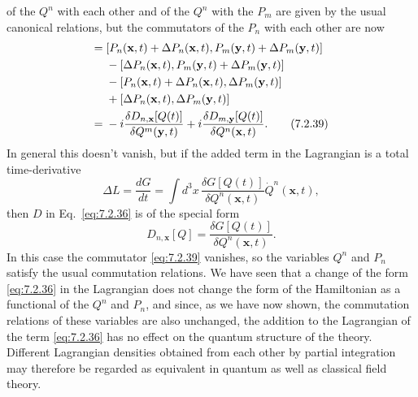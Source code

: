 of the $Q^n$ with each other and of the $Q^n$ with the $P_m$ are given by the
usual canonical relations, but the commutators of the $P_n$ with each other
are now
\begin{align}
[P_n(\mathbf{x},t),P_m(\mathbf{y},t)]
={}&[P_n(\mathbf{x},t)+\Delta P_n(\mathbf{x},t),
P_m(\mathbf{y},t)+\Delta P_m(\mathbf{y},t)]
\notag\\
&-[\Delta P_n(\mathbf{x},t),P_m(\mathbf{y},t)+\Delta P_m(\mathbf{y},t)]
\notag\\
&-[P_n(\mathbf{x},t)+\Delta P_n(\mathbf{x},t),\Delta P_m(\mathbf{y},t)]
\notag\\
&+[\Delta P_n(\mathbf{x},t),\Delta P_m(\mathbf{y},t)]
\notag\\
={}&-i\frac{\delta D_{n,\mathbf{x}}[Q(t)]}{\delta Q^m(\mathbf{y},t)}
+i\frac{\delta D_{m,\mathbf{y}}[Q(t)]}{\delta Q^n(\mathbf{x},t)}.
\tag{7.2.39}\label{eq:7.2.39}
\end{align}
In general this doesn't vanish, but if the added term in the Lagrangian is
a total time-derivative
\begin{equation}
\Delta L=\frac{dG}{dt}=\int d^3x\,
\frac{\delta G[Q(t)]}{\delta Q^n(\mathbf{x},t)}\dot Q^n(\mathbf{x},t),
\tag{7.2.40}\label{eq:7.2.40}
\end{equation}
then $D$ in Eq.~\eqref{eq:7.2.36} is of the special form
\begin{equation}
D_{n,\mathbf{x}}[Q]=\frac{\delta G[Q(t)]}{\delta Q^n(\mathbf{x},t)}.
\tag{7.2.41}\label{eq:7.2.41}
\end{equation}
In this case the commutator \eqref{eq:7.2.39} vanishes, so the variables $Q^n$ and
$P_n$ satisfy the usual commutation relations. We have seen that a change
of the form \eqref{eq:7.2.36} in the Lagrangian does not change the form of the
Hamiltonian as a functional of the $Q^n$ and $P_n$, and since, as we have now
shown, the commutation relations of these variables are also unchanged,
the addition to the Lagrangian of the term \eqref{eq:7.2.36} has no effect on the
quantum structure of the theory. Different Lagrangian densities obtained
from each other by partial integration may therefore be regarded as
equivalent in quantum as well as classical field theory.
